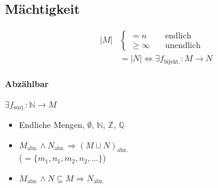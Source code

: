 \subsection{Mächtigkeit}

\begin{align*}
  |M| & \begin{cases}
    = n \quad         & \text{endlich}   \\
    \geq \infty \quad & \text{unendlich}
  \end{cases}                                         \\
      & = |N| \Leftrightarrow \exists f_{\text{bijekt.}}: M \rightarrow N
\end{align*}

\paragraph{Abzählbar}  $\exists f_\text{surj.}: \mathbb{N} \rightarrow M$

\begin{itemize}
  \item Endliche Mengen, $\emptyset$, $\mathbb{N}$, $\mathbb{Z}$, $\boldsymbol{\mathbb{Q}}$
  \item $M_\text{abz.} \land N_\text{abz.} \Rightarrow (M \cup N)_\text{abz.}$ \\
        ($= \{ m_1, n_1, m_2, n_2, \dots \}$)

  \item $M_\text{abz.} \land N \subseteq M \Rightarrow N_\text{abz.}$
\end{itemize}

